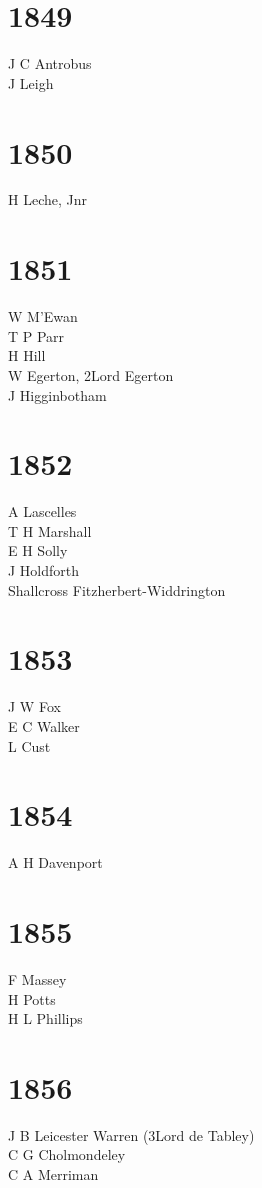 \begin{multicols}{2}
  \section*{1849}
  J C Antrobus \\
  J Leigh \\
  \section*{1850}
  H Leche, Jnr \\
  \section*{1851}
  W M'Ewan \\
  T P Parr \\
  H Hill \\
  W Egerton, 2\nd Lord Egerton \\
  J Higginbotham \\
  \section*{1852}
  A Lascelles \\
  T H Marshall \\
  E H Solly \\
  J Holdforth \\
  Shallcross Fitzherbert-Widdrington \\
  \section*{1853}
  J W Fox \\
  E C Walker \\
  L Cust \\
  \section*{1854}
  A H Davenport \\
  \section*{1855}
  F Massey \\
  H Potts \\
  H L Phillips \\
  \section*{1856}
  J B Leicester Warren (3\rd Lord de Tabley) \\
  C G Cholmondeley \\
  C A Merriman \\

\end{multicols}

